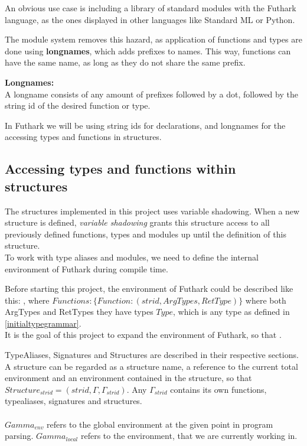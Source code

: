 An obvious use case is including a library of standard modules with the Futhark
language, as the ones displayed in other languages like Standard
ML\cite{sml_standard_lib} or Python\cite{python3_docs}.

The module system removes this hazard, as application of functions and types are
done using \textbf{longnames}, which adds prefixes to names. This way, functions
can have the same name, as long as they do not share the same prefix.

\begin{tcolorbox}
\textbf{Longnames:}\\
A longname consists of any amount of prefixes followed by a dot, followed by the
string id of the desired function or type.

In Futhark we will be using string ids for declarations, and longnames for
the accessing types and functions in structures.
\end{tcolorbox}


\subsection{Accessing types and functions within structures}
The structures implemented in this project uses variable shadowing.
When a new structure is defined, \textit{variable shadowing} grants this
structure access to all previously defined functions, types and modules up until
the definition of this structure.\\

To work with type aliases and modules, we need to define the internal
environment of Futhark during compile time.

Before starting this project, the environment of Futhark could be described like
this:
, where $Functions : \{ Function : (strid,
  ArgTypes, RetType) \}$ where both ArgTypes and RetTypes they
have types $Type$, which is any type as defined in
\ref{initialtypegrammar}.\\

It is the goal of this project to expand the environment of Futhark, so that
.

TypeAliases, Signatures and Structures are described in their respective
sections. A structure can be regarded as a structure name, a reference to the
current total environment and an environment contained in the structure, so that
$Structure_{strid} = (strid, \Gamma,  \Gamma_{strid})$. Any $\Gamma_{strid}$
contains its own functions, typealiases, signatures and structures.\\
\\
$Gamma_{env}$ refers to the global environment at the given point in program
parsing.
$Gamma_{local}$ refers to the environment, that we are currently working in.

